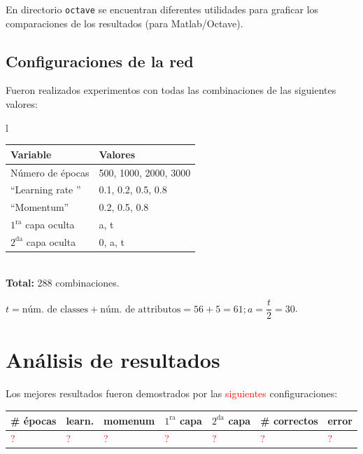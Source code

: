 \documentclass{article}
\newcommand{\red}[1]	    {\textcolor{red}{#1}}
\begin{document}
\medskip
En directorio \verb|octave| se encuentran diferentes utilidades para graficar los comparaciones de los resultados (para Matlab/Octave).

\subsection{Configuraciones de la red}

Fueron realizados experimentos con todas las combinaciones de las siguientes valores:

\begin{center}
\begin{tabular}{l}
\begin{tabular}{|l|l|}
\hline
Variable 					& Valores				\\
\hline
Número de épocas			& 500, 1000, 2000, 3000 \\
``Learning rate ''  		& 0.1, 0.2, 0.5, 0.8 	\\
``Momentum''				& 0.2, 0.5, 0.8 		\\
$1^{\text{ra}}$ capa oculta	& a, t					\\
$2^{\text{da}}$ capa oculta	& 0, a, t				\\
\hline
\end{tabular}\\
\textbf{Total:} 288 combinaciones.
\end{tabular}
\end{center}

$t=\text{núm. de classes} + \text{núm. de attributos} = 56+5=61; a=\dfrac{t}{2}=30$.



\section{Análisis de resultados}

Los mejores resultados fueron demostrados por las \red{siguientes} configuraciones:

\begin{center}
\begin{tabular}{|l|l|l|l|l|l|l|}
\hline
\# épocas & learn. & momenum & $1^{\text{ra}}$ capa & $2^{\text{da}}$ capa & \# correctos & error \\
\hline
\red{?} & \red{?} & \red{?} & \red{?} & \red{?} & \red{?} & \red{?} \\
\hline
\end{tabular}
\end{center}
\end{document}
